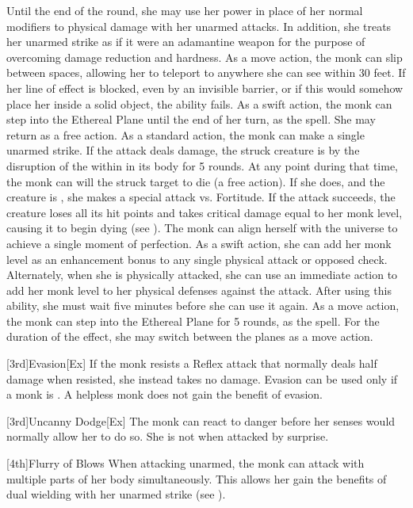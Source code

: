 Until the end of the round, she may use her \ki power in place of her normal modifiers to physical damage with her unarmed attacks.
In addition, she treats her unarmed strike as if it were an adamantine weapon for the purpose of overcoming damage reduction and hardness.
As a move action, the monk can slip between spaces, allowing her to teleport to anywhere she can see within 30 feet.
If her line of effect is blocked, even by an invisible barrier, or if this would somehow place her inside a solid object, the ability fails.
 As a swift action, the monk can step into the Ethereal Plane until the end of her turn, as the 
spell.
She may return as a free action.
As a standard action, the monk can make a single unarmed strike.
If the attack deals damage, the struck creature is \sickened by the disruption of the \ki within in its body for 5 rounds.
At any point during that time, the monk can will the struck target to die (a free action).
If she does, and the creature is \bloodied, she makes a special attack vs. Fortitude.
If the attack succeeds, the creature loses all its hit points and takes critical damage equal to her monk level, causing it to begin dying (see ).
The monk can align herself with the universe to achieve a single moment of perfection.
As a swift action, she can add her monk level as an enhancement bonus to any single physical attack or opposed check.
Alternately, when she is physically attacked, she can use an immediate action to add her monk level to her physical defenses against the attack.
After using this ability, she must wait five minutes before she can use it again.
 As a move action, the monk can step into the Ethereal Plane for 5 rounds, as the 
spell.
For the duration of the effect, she may switch between the planes as a move action.

[3rd]{Evasion}[Ex]
If the monk resists a Reflex attack that normally deals half damage when resisted, she instead takes no damage.
Evasion can be used only if a monk is \unencumbered.
A helpless monk does not gain the benefit of evasion.

[3rd]{Uncanny Dodge}[Ex]
The monk can react to danger before her senses would normally allow her to do so.
She is not \unaware when attacked by surprise.

[4th]{Flurry of Blows}
When attacking unarmed, the monk can attack with multiple parts of her body simultaneously.
This allows her gain the benefits of dual wielding with her unarmed strike (see ).

